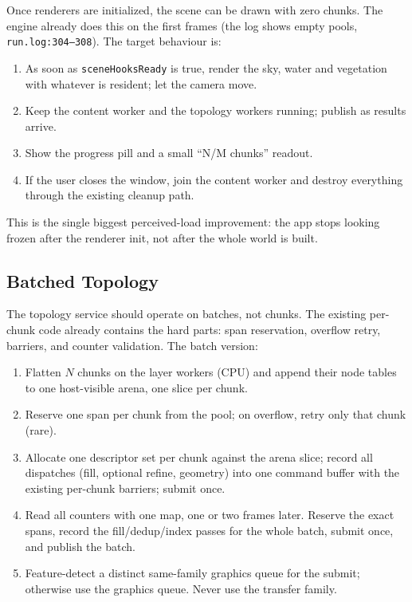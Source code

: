 \documentclass[11pt,a4paper]{article}
\begin{document}
Once renderers are initialized, the scene can be drawn with zero chunks. The
engine already does this on the first frames (the log shows empty pools,
\texttt{run.log:304--308}). The target behaviour is:

\begin{enumerate}[leftmargin=1.5em,itemsep=2pt]
\item As soon as \texttt{sceneHooksReady} is true, render the sky, water and
vegetation with whatever is resident; let the camera move.
\item Keep the content worker and the topology workers running; publish as
results arrive.
\item Show the progress pill and a small ``N/M chunks'' readout.
\item If the user closes the window, join the content worker and destroy
everything through the existing cleanup path.
\end{enumerate}

This is the single biggest perceived-load improvement: the app stops looking
frozen after the renderer init, not after the whole world is built.

\subsection{Batched Topology}

The topology service should operate on batches, not chunks. The existing
per-chunk code already contains the hard parts: span reservation, overflow
retry, barriers, and counter validation. The batch version:

\begin{enumerate}[leftmargin=1.5em,itemsep=2pt]
\item Flatten $N$ chunks on the layer workers (CPU) and append their node
tables to one host-visible arena, one slice per chunk.
\item Reserve one span per chunk from the pool; on overflow, retry only that
chunk (rare).
\item Allocate one descriptor set per chunk against the arena slice; record
all dispatches (fill, optional refine, geometry) into one command buffer with
the existing per-chunk barriers; submit once.
\item Read all counters with one map, one or two frames later. Reserve the
exact spans, record the fill/dedup/index passes for the whole batch, submit
once, and publish the batch.
\item Feature-detect a distinct same-family graphics queue for the submit;
otherwise use the graphics queue. Never use the transfer family.
\end{enumerate}
\end{document}
